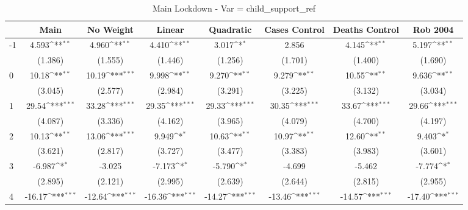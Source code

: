 \documentclass{article}
\begin{document}
{
\def\sym#1{\ifmmode^{#1}\else\(^{#1}\)\fi}
\begin{longtable}{l*{7}{c}}
\caption{Main Lockdown - Var = child\_support\_ref}\\
\hline\hline\endfirsthead\hline\endhead\hline\endfoot\endlastfoot
                &\multicolumn{1}{c}{Main}&\multicolumn{1}{c}{No Weight}&\multicolumn{1}{c}{Linear}&\multicolumn{1}{c}{Quadratic}&\multicolumn{1}{c}{Cases Control}&\multicolumn{1}{c}{Deaths Control}&\multicolumn{1}{c}{Rob 2004}\\
\hline
-1              &    4.593\sym{**} &    4.960\sym{**} &    4.410\sym{**} &    3.017\sym{*}  &    2.856         &    4.145\sym{**} &    5.197\sym{**} \\
                &  (1.386)         &  (1.555)         &  (1.446)         &  (1.256)         &  (1.701)         &  (1.400)         &  (1.690)         \\
0               &    10.18\sym{**} &    10.19\sym{***}&    9.998\sym{**} &    9.270\sym{**} &    9.279\sym{**} &    10.55\sym{**} &    9.636\sym{**} \\
                &  (3.045)         &  (2.577)         &  (2.984)         &  (3.291)         &  (3.225)         &  (3.132)         &  (3.034)         \\
1               &    29.54\sym{***}&    33.28\sym{***}&    29.35\sym{***}&    29.33\sym{***}&    30.35\sym{***}&    33.67\sym{***}&    29.66\sym{***}\\
                &  (4.087)         &  (3.336)         &  (4.162)         &  (3.965)         &  (4.079)         &  (4.700)         &  (4.197)         \\
2               &    10.13\sym{**} &    13.06\sym{***}&    9.949\sym{*}  &    10.63\sym{**} &    10.97\sym{**} &    12.60\sym{**} &    9.403\sym{*}  \\
                &  (3.621)         &  (2.817)         &  (3.727)         &  (3.477)         &  (3.383)         &  (3.983)         &  (3.601)         \\
3               &   -6.987\sym{*}  &   -3.025         &   -7.173\sym{*}  &   -5.790\sym{*}  &   -4.699         &   -5.462         &   -7.774\sym{*}  \\
                &  (2.895)         &  (2.121)         &  (2.995)         &  (2.639)         &  (2.644)         &  (2.815)         &  (2.955)         \\
4               &   -16.17\sym{***}&   -12.64\sym{***}&   -16.36\sym{***}&   -14.27\sym{***}&   -13.46\sym{***}&   -14.57\sym{***}&   -17.40\sym{***}\\

\end{longtable}}
\end{document}
